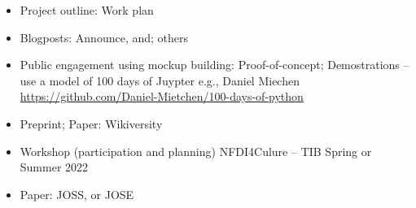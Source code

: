 \documentclass{article}
\begin{document}
\begin{itemize}
\item Project outline: Work plan


\item Blogposts: Announce, and; others


\item Public engagement using mockup building: Proof-of-concept; Demostrations – use a model of 100 days of Juypter e.g., Daniel Miechen \href{https://github.com/Daniel-Mietchen/100-days-of-python}{https://github.com/Daniel-Mietchen/100-days-of-python} 


\item Preprint; Paper: Wikiversity


\item Workshop (participation and planning) NFDI4Culure – TIB Spring or Summer 2022


\item Paper: JOSS, or JOSE


\end{itemize}

\printbibliography[title={Bibliography}]
\end{document}
